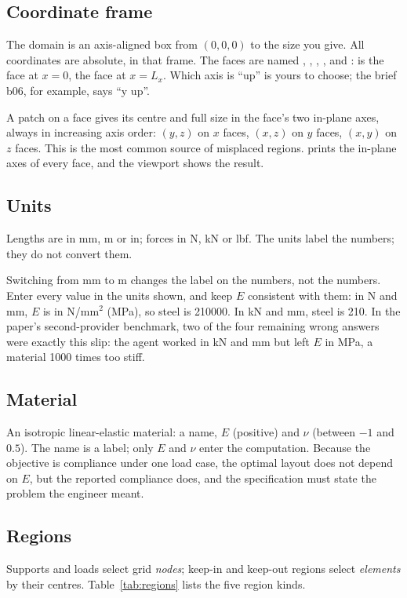 \subsection{Coordinate frame}
The domain is an axis-aligned box from $(0,0,0)$ to the size you give. All coordinates are absolute, in that frame. The
faces are named , , , ,  and :  is the face at $x = 0$,
 the face at $x = L_x$. Which axis is ``up'' is yours to choose; the brief b06, for example, says ``y up''.

A patch on a face gives its centre and full size in the face's two in-plane axes, always in increasing axis order:
$(y,z)$ on $x$ faces, $(x,z)$ on $y$ faces, $(x,y)$ on $z$ faces. This is the most common source of misplaced regions.
 prints the in-plane axes of every face, and the viewport shows the result.

\subsection{Units}
Lengths are in mm, m or in; forces in N, kN or lbf. The units label the numbers; they do not convert them.

\begin{warnbox}
Switching from mm to m changes the label on the numbers, not the numbers. Enter every value in the units shown, and
keep $E$ consistent with them: in N and mm, $E$ is in N/mm$^2$ (MPa), so steel is 210000. In kN and mm, steel is 210. In
the paper's second-provider benchmark, two of the four remaining wrong answers were exactly this slip: the agent worked
in kN and mm but left $E$ in MPa, a material 1000 times too stiff.
\end{warnbox}

\subsection{Material}
An isotropic linear-elastic material: a name, $E$ (positive) and $\nu$ (between $-1$ and $0.5$). The name is a label;
only $E$ and $\nu$ enter the computation. Because the objective is compliance under one load case, the optimal layout
does not depend on $E$, but the reported compliance does, and the specification must state the problem the engineer
meant.

\subsection{Regions}\label{sec:regions}
Supports and loads select grid \emph{nodes}; keep-in and keep-out regions select \emph{elements} by their centres.
Table~\ref{tab:regions} lists the five region kinds.

